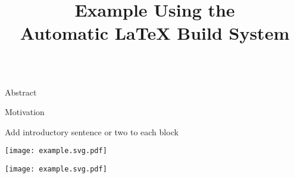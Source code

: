 \documentclass{cbxposter}
\title
{%
  Example Using the \\ Automatic LaTeX Build System
}
\renewcommand{\smallskip}{\vspace{0.16667in}}
\begin{document}
\begin{frame}[fragile,t]{}
\vspace{0.1in}
\begin{columns}[T]


\begin{column}{10.5in}
\vspace{0.4in}


\begin{block}{Abstract}
  \lipsum[1]
\end{block}


\vspace{0.67in}
\begin{block}{Motivation}
  \centering
  \smallskip

  Add introductory sentence or two to each block

  \begin{minipage}[t]{0.45\tw}
    \vspace{0pt}\centering


    \smallskip\smallskip
    \texttt{[image: example.svg.pdf]}

  \end{minipage}
  \hspace{0.2in}
  \begin{minipage}[t]{0.45\tw}
    \vspace{0pt}\centering


    \smallskip\smallskip
    \texttt{[image: example.svg.pdf]}

  \end{minipage}

  \smallskip\smallskip
\end{block}

\end{column}



\end{columns}
\end{frame}
\end{document}

